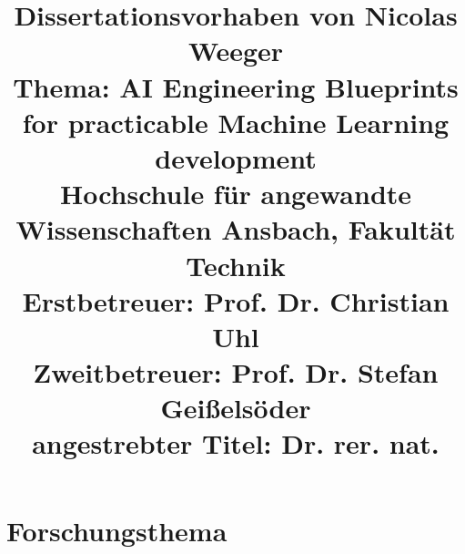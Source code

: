\documentclass[11pt,a4paper,pointlessnumbers]{scrartcl}
\renewcommand{\normalsize}{\fontsize{11pt}{13.2pt}\selectfont}
\theoremstyle{break}
\numberwithin{equation}{section}
\begin{document}
\pagestyle{fancy}
\fancyhf{}
\fancyhead[L]{\textit{\nouppercase{\leftmark}}}
\fancyhead[R]{\thepage}
\date{}
\title{\textbf{Dissertationsvorhaben von Nicolas Weeger}
\\{Thema: AI Engineering Blueprints for practicable Machine Learning development}
\\{\normalsize Hochschule für angewandte Wissenschaften Ansbach, Fakultät Technik}
\\{\normalsize Erstbetreuer: Prof. Dr. Christian Uhl}\vspace{-.5em}
\\{\normalsize Zweitbetreuer: Prof. Dr. Stefan Geißelsöder}
\\{\normalsize angestrebter Titel: Dr. rer. nat.}}
\maketitle
\vspace{-14ex}

\thispagestyle{empty}
\section{Forschungsthema} \label{kap:motivation}
\end{document}
